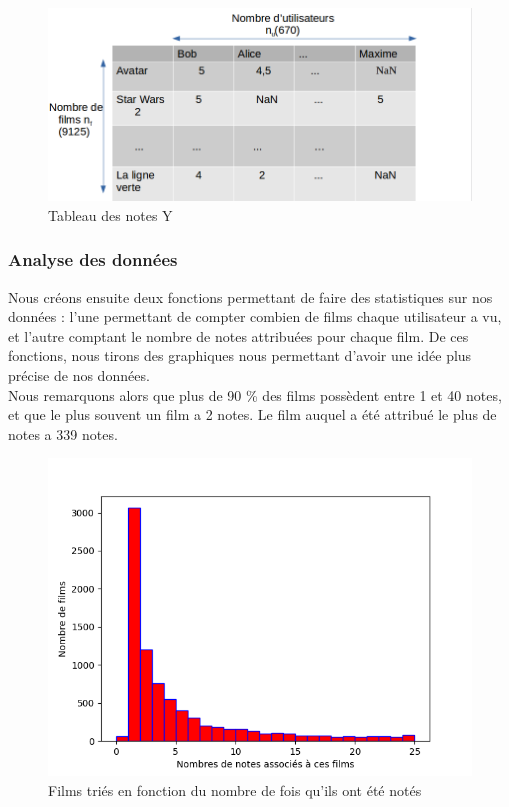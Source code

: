 \documentclass[a4paper,10pt]{article}
\begin{document}
\begin{figure}[H]
  \centering
  \includegraphics[scale=0.4]{Ynew.png}
  \caption{Tableau des notes Y}
\end{figure}

\subsubsection{Analyse des données}

Nous créons ensuite deux fonctions permettant de faire des statistiques sur nos données : l’une permettant de compter combien de films chaque utilisateur a vu, et l’autre comptant le nombre de notes attribuées pour chaque film. De ces fonctions, nous tirons des graphiques nous permettant d'avoir une idée plus précise de nos données.\\

Nous remarquons alors que plus de 90 \% des films possèdent entre 1 et 40 notes, et que le plus souvent un film a 2 notes. Le film auquel a été attribué le plus de notes a 339 notes.

\begin{figure}[H]
  \centering
\includegraphics[scale=0.5]{hist2.png}
\caption{Films triés en fonction du nombre de fois qu'ils ont été notés}
\end{figure}
\end{document}
